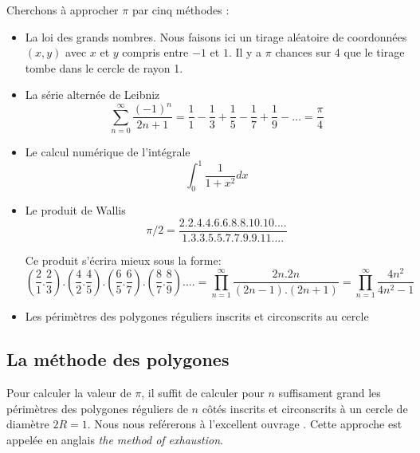 Cherchons à approcher $\pi$ par cinq méthodes :
\begin{itemize}
	\item La loi des grands nombres. 
	Nous faisons ici un tirage aléatoire de coordonnées $(x,y)$ avec $x$ et $y$ compris entre $-1$ et $1$.
	Il y a  $\pi$ chances sur 4 que le tirage tombe dans le cercle de rayon 1. 
		
	\item La série alternée de Leibniz 
	\[ \sum_{n=0}^\infty \frac{(-1)^n}{2n+1} = \frac{1}{1} -\frac{1}{3}+\frac{1}{5}-\frac{1}{7}+\frac{1}{9} - \dots = \frac{\pi}{4}  \]
	
	\item Le calcul numérique de l'intégrale 
	$$\int_0^1 \frac{1}{1+x^2} dx$$
	
	\item  Le produit de Wallis 
	\[ \pi /2 = \frac{2.2.4.4.6.6.8.8.10.10. ...} {1.3.3.5.5.7.7.9.9.11. ...}\]
	
	Ce produit s'écrira mieux sous la forme:
	\[ ( \frac{2}{1}.\frac{2}{3} ) . (\frac{4}{2}.\frac{4}{5} ).(\frac{6}{5}.\frac{6}{7} ).(\frac{8}{7}.\frac{8}{9} ) . ...  =  \prod_{n=1}^\infty \frac{2n.2n}{(2n-1).(2n+1)} = \prod_{n=1}^\infty \frac{4n^2}{4n^2-1}\]
	
	\item Les périmètres des polygones réguliers inscrits et circonscrits au cercle 
	\begin{figure}[H]
		\centering
		\usetikzlibrary{shapes.geometric}
		\end{figure}
	
\end{itemize}

\subsection{La méthode des polygones}	
Pour calculer la valeur de $\pi$, il suffit de calculer pour $n$ suffisament grand
les périmètres des polygones réguliers de $n$ côtés inscrits et circonscrits à un cercle de diamètre
$2R=1$. 
Nous nous reférerons à l'excellent ouvrage \cite{gb}.
Cette approche est appelée en anglais \textit{the method of exhaustion}.



